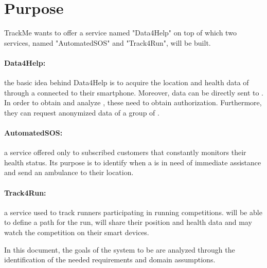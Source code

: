 \documentclass[../../rasd.tex]{subfiles}
\begin{document}
\section{Purpose}
			
			TrackMe wants to offer a service named "Data4Help" on top of which two services, named "AutomatedSOS" and "Track4Run", will be built.
			\paragraph{Data4Help:} the basic idea behind Data4Help is to acquire the location and health data of  through a  connected to their smartphone. Moreover, data can be directly sent to . In order to obtain and analyze , these need to obtain  authorization. Furthermore, they can request anonymized data of a group of .
			
			\paragraph{AutomatedSOS:} a service offered only to subscribed customers that constantly monitors their health status. Its purpose is to identify when a  is in need of immediate assistance and send an ambulance to their location.
			
			\paragraph{Track4Run:} a service used to track runners participating in running competitions.  will be able to define a path for the run,  will share their position and health data and  may watch the competition on their smart devices.

			In this document, the goals of the system to be are analyzed through the identification of the needed requirements and domain assumptions. 
\end{document}
